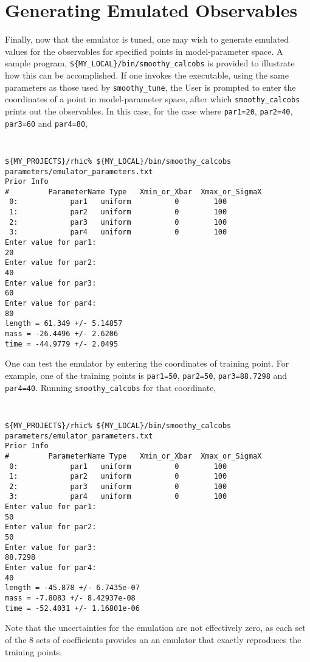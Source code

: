 \documentclass[UserManual.tex]{subfiles}
\begin{document}
\section{Generating Emulated Observables}
Finally, now that the emulator is tuned, one may wish to generate emulated values for the observables for specified points in model-parameter space. A sample program, {\tt \$\{MY\_LOCAL\}/bin/smoothy\_calcobs} is provided to illustrate how this can be accomplished. If one invokes the executable, using the same parameters as those used by {\tt smoothy\_tune}, the User is prompted to enter the coordinates of a point in model-parameter space, after which {\tt smoothy\_calcobs} prints out the observables. In this case, for the case where {\tt par1=20}, {\tt par2=40}, {\tt par3=60} and {\tt par4=80},

{\tt
\begin{verbatim}
${MY_PROJECTS}/rhic% ${MY_LOCAL}/bin/smoothy_calcobs parameters/emulator_parameters.txt
Prior Info
#         ParameterName Type   Xmin_or_Xbar  Xmax_or_SigmaX
 0:            par1   uniform          0        100
 1:            par2   uniform          0        100
 2:            par3   uniform          0        100
 3:            par4   uniform          0        100
Enter value for par1:
20
Enter value for par2:
40
Enter value for par3:
60
Enter value for par4:
80
length = 61.349 +/- 5.14857
mass = -26.4496 +/- 2.6206
time = -44.9779 +/- 2.0495
\end{verbatim}
}

One can test the emulator by entering the coordinates of training point. For example, one of the training points is {\tt par1=50}, {\tt par2=50}, {\tt par3=88.7298} and {\tt par4=40}. Running {\tt smoothy\_calcobs} for that coordinate,

{\tt
\begin{verbatim}
${MY_PROJECTS}/rhic% ${MY_LOCAL}/bin/smoothy_calcobs parameters/emulator_parameters.txt
Prior Info
#         ParameterName Type   Xmin_or_Xbar  Xmax_or_SigmaX
 0:            par1   uniform          0        100
 1:            par2   uniform          0        100
 2:            par3   uniform          0        100
 3:            par4   uniform          0        100
Enter value for par1:
50
Enter value for par2:
50
Enter value for par3:
88.7298
Enter value for par4:
40
length = -45.878 +/- 6.7435e-07
mass = -7.8083 +/- 8.42937e-08
time = -52.4031 +/- 1.16801e-06
\end{verbatim}
}
Note that the uncertainties for the emulation are not effectively zero, as each set of the 8 sets of coefficients provides an an emulator that exactly reproduces the training points.
\end{document}
